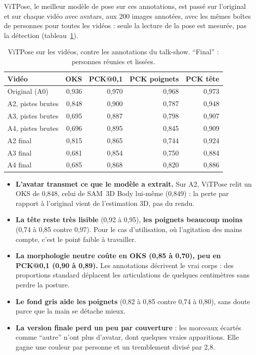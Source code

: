 \documentclass[11pt,a4paper]{report}
\begin{document}
ViTPose, le meilleur modèle de pose sur ces annotations, est passé sur l'original et sur chaque vidéo avec avatars, aux 200 images
annotées, avec les mêmes boîtes de personnes pour toutes les vidéos : seule la lecture de la pose est mesurée, pas la détection
(tableau~\ref{tab:res-utility}).

\begin{table}[H]
\centering
\caption{ViTPose sur les vidéos, contre les annotations du talk-show. \enquote{Final} : personnes réunies et lissées.}
\label{tab:res-utility}
\small
\begin{tabular}{@{}lrrrr@{}}
\toprule
Vidéo & OKS & PCK@0,1 & PCK poignets & PCK tête \\
\midrule
Original (A0) & 0,936 & 0,970 & 0,968 & 0,973 \\
A2, pistes brutes & 0,848 & 0,900 & 0,787 & 0,948 \\
A3, pistes brutes & 0,695 & 0,887 & 0,798 & 0,907 \\
A4, pistes brutes & 0,696 & 0,895 & 0,845 & 0,909 \\
A2 final & 0,815 & 0,865 & 0,744 & 0,924 \\
A3 final & 0,681 & 0,854 & 0,750 & 0,884 \\
A4 final & 0,685 & 0,868 & 0,820 & 0,886 \\
\bottomrule
\end{tabular}
\end{table}

\begin{itemize}
    \item \textbf{L'avatar transmet ce que le modèle a extrait.} Sur A2, ViTPose relit un OKS de 0,848, celui de SAM~3D Body lui-même
    (0,849) : la perte par rapport à l'original vient de l'estimation 3D, pas du rendu.
    \item \textbf{La tête reste très lisible} (0,92 à 0,95), \textbf{les poignets beaucoup moins} (0,74 à 0,85 contre 0,97). Pour le cas
    d'utilisation, où l'agitation des mains compte, c'est le point faible à travailler.
    \item \textbf{La morphologie neutre coûte en OKS (0,85 à 0,70), peu en PCK@0,1 (0,90 à 0,89).} Les annotations décrivent le vrai
    corps : des proportions standard déplacent les articulations de quelques centimètres sans perdre la posture.
    \item \textbf{Le fond gris aide les poignets} (0,82 à 0,85 contre 0,74 à 0,80), sans doute parce que la main se détache mieux.
    \item \textbf{La version finale perd un peu par couverture} : les morceaux écartés comme \enquote{autre} n'ont plus d'avatar, dont
    quelques vraies apparitions. Elle gagne une couleur par personne et un tremblement divisé par 2,8.
\end{itemize}
\end{document}
